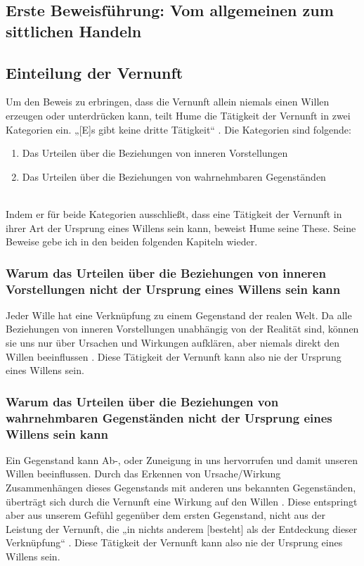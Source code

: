 \documentclass[ngerman,12pt]{diazessay} %
\begin{document}
\begin{doublespace}

\section{Erste Beweisführung: Vom allgemeinen zum sittlichen Handeln}

\subsection{Einteilung der Vernunft}

Um den Beweis zu erbringen, dass die Vernunft allein niemals einen Willen erzeugen oder unterdrücken kann, teilt Hume die Tätigkeit der Vernunft in zwei Kategorien ein. „[E]s gibt keine dritte Tätigkeit“ \cite[S.540]{Hume.2013}. Die Kategorien sind folgende:
\begin{enumerate}
	\item Das Urteilen über die Beziehungen von inneren Vorstellungen
	\item Das Urteilen über die Beziehungen von wahrnehmbaren Gegenständen
\end{enumerate}
\cite[vgl. S.540]{Hume.2013} \\
Indem er für beide Kategorien ausschließt, dass eine Tätigkeit der Vernunft in ihrer Art der Ursprung eines Willens sein kann, beweist Hume seine These. Seine Beweise gebe ich in den beiden folgenden Kapiteln wieder.

\subsubsection{Warum das Urteilen über die Beziehungen von inneren Vorstellungen nicht der Ursprung eines Willens sein kann} Jeder Wille hat eine Verknüpfung zu einem Gegenstand der realen Welt. Da alle Beziehungen von inneren Vorstellungen unabhängig von der Realität sind, können sie uns nur über Ursachen und Wirkungen aufklären, aber niemals direkt den Willen beeinflussen \cite[siehe S.484]{Hume.2013}. Diese Tätigkeit der Vernunft kann also nie der Ursprung eines Willens sein.
\subsubsection{Warum das Urteilen über die Beziehungen von wahrnehmbaren Gegenständen nicht der Ursprung eines Willens sein kann}
Ein Gegenstand kann Ab-, oder Zuneigung in uns hervorrufen und damit unseren Willen beeinflussen. Durch das Erkennen von Ursache/Wirkung Zusammenhängen dieses Gegenstands mit anderen uns bekannten Gegenständen, überträgt sich durch die Vernunft eine Wirkung auf den Willen \cite[siehe S.485]{Hume.2013}. Diese entspringt aber aus unserem Gefühl gegenüber dem ersten Gegenstand, nicht aus der Leistung der Vernunft, die „in nichts anderem [besteht] als der Entdeckung dieser Verknüpfung“ \cite[S.485]{Hume.2013}. Diese Tätigkeit der Vernunft kann also nie der Ursprung eines Willens sein.

\end{doublespace}
\end{document}
